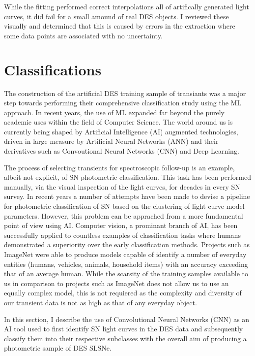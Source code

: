 While the fitting performed correct interpolations all of artifically generated light curves, it did fail for a small amound of real DES objects. I reviewed these visually and determined that this is caused by errors in the extraction where some data points are associated with no uncertainty.

\section{Classifications} \label{sec:CNN}
The construction of the artificial DES training sample of transiants was a major step towards performing their comprehensive classification study using the ML approach. In recent years, the use of ML expanded far beyond the purely academic uses within the field of Computer Science. The world around us is currently being shaped by Artificial Intelligence (AI) augmented technologies, driven in large measure by Artificial Neural Networks (ANN) and their derivatives such as Convoutional Neural Networks (CNN) and Deep Learning.

The process of selecting transients for spectroscopic follow-up is an example, albeit not explicit, of SN photometric classification. This task has been performed manually, via the visual inspection of the light curves, for decades in every SN survey. In recent years a number of attempts have been made to devise a pipeline for photometric classification of SN based on the clustering of light curve model parameters. However, this problem can be apprached from a more fundamental point of view using AI. Computer vision, a prominant branch of AI, has been successfully applied to countless examples of classification tasks where humans demonstrated a superiority over the early classification methods. Projects such as ImageNet \citep{Russakovsky2014} were able to produce models capable of identify a number of everyday entities (humans, vehicles, animals, household items) with an accuracy exceeding that of an average human. While the scarsity of the training samples available to us in comparison to projects such as ImageNet does not allow us to use an equally complex model, this is not requiered as the complexity and diversity of our transient data is not as high as that of any everyday object.

In this section, I describe the use of Convolutional Neural Networks (CNN) as an AI tool used to first identify SN light curves in the DES data and subsequently classify them into their respective subclasses with the overall aim of producing a photometric sample of DES SLSNe.

